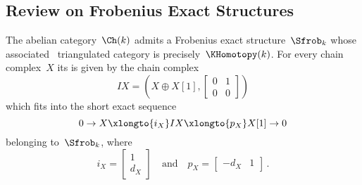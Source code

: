 \documentclass[a4paper,10pt]{scrartcl}
\begin{document}
\subsection{Review on Frobenius Exact Structures}

The abelian category~$\Ch(k)$ admits a Frobenius exact structure~$\Sfrob_k$ whose associated~{} triangulated category is precisely~$\KHomotopy(k)$.
For every chain complex~$X$ its  is given by the chain complex
\[
  IX
  =
  \left(
    X \oplus X[1],
    \begin{bmatrix}
      0 & 1 \\
      0 & 0
    \end{bmatrix}
  \right)
\]
which fits into the short exact sequence
\begin{equation}
  \label{ses of chain complexes}
  0
  \to
  X
  \xlongto{ i_X }
  IX
  \xlongto{ p_X }
  X[1]
  \to
  0
\end{equation}
belonging to~$\Sfrob_k$, where
\[
  i_X
  =
  \begin{bmatrix}
    1 \\
    d_X
  \end{bmatrix}
  \quad\text{and}\quad
  p_X
  =
  \begin{bmatrix}
    -d_X & 1
  \end{bmatrix} \,.
\]
\end{document}
